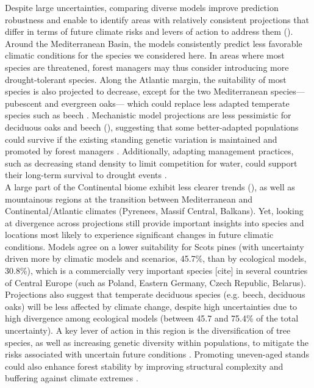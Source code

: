 \documentclass[11pt,letter]{article}
\begin{document}
Despite large uncertainties, comparing diverse models improve prediction robustness and enable to identify areas with relatively consistent projections that differ in terms of future climate risks and levers of action to address them ().
Around the Mediterranean Basin, the models consistently predict less favorable climatic conditions for the species we considered here. In areas where most species are threatened, forest managers may thus consider introducing more drought-tolerant species. Along the Atlantic margin, the suitability of most species is also projected to decrease, except for the two Mediterranean species---pubescent and evergreen oaks--- which could replace less adapted temperate species such as beech \citep{Penuelas2003}. Mechanistic model projections are less pessimistic for deciduous oaks and beech (), suggesting that some better-adapted populations could survive if the existing standing genetic variation is maintained and promoted by forest managers \citep{Brang2014}. Additionally, adapting management practices, such as decreasing stand density to limit competition for water, could support their long-term survival to drought events \citep{Young2023}.\\
A large part of the Continental biome exhibit less clearer trends (), as well as mountainous regions at the transition between Mediterranean and Continental/Atlantic climates (Pyrenees, Massif Central, Balkans). Yet, looking at divergence across projections still provide important insights into species and locations most likely to experience significant changes in future climatic conditions. Models agree on a lower suitability for Scots pines (with uncertainty driven more by climatic models and scenarios, 45.7\%, than by ecological models, 30.8\%), which is a commercially very important species [cite] in several countries of Central Europe (such as Poland, Eastern Germany, Czech Republic, Belarus).
Projections also suggest that temperate deciduous species (e.g. beech, deciduous oaks) will be less affected by climate change, despite high uncertainties due to high divergence among ecological models (between 45.7 and 75.4\% of the total uncertainty).
A key lever of action in this region is the diversification of tree species, as well as increasing genetic diversity within populations, to mitigate the risks associated with uncertain future conditions \citep{Morin2014, Ammer2019, Pretzsch2021, Vospernik2024}. Promoting uneven-aged stands could also enhance forest stability by improving structural complexity and buffering against climate extremes \citep{Vangi2024, Zhang2024a}.\\
\end{document}
